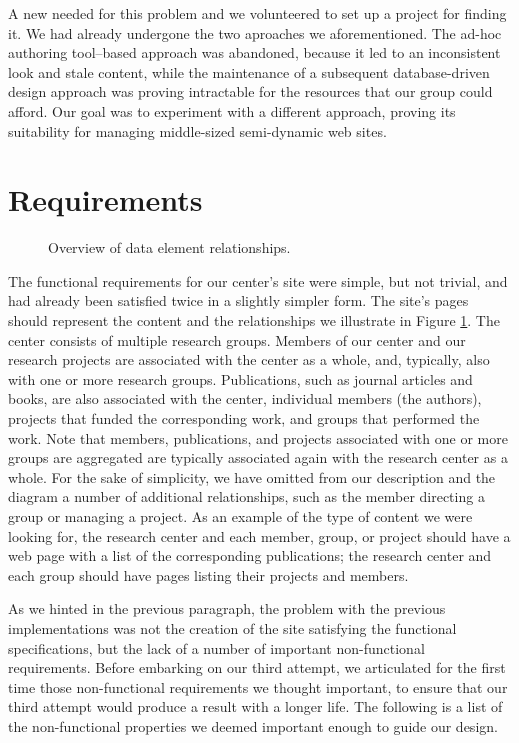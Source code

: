 \documentclass[10pt]{article}
\begin{document}
A new needed for this problem and we volunteered to 
set up a project for finding it. We had already undergone the 
two aproaches we aforementioned.
The ad-hoc authoring tool--based approach was abandoned,
because it led to an inconsistent look and stale content,
while the maintenance of a subsequent database-driven
design approach was proving intractable for the resources that
our group could afford.
Our goal was to experiment with a
different approach,
proving its suitability for managing middle-sized semi-dynamic
web sites.

\section{Requirements}
\label{sec:req}
\begin{figure}
\begin{center}
\leavevmode
{}
\end{center}
\caption{
\label{fig:diag}
Overview of data element relationships.}
\end{figure}

The functional requirements for our center's site were
simple, but not trivial, and had already been satisfied
twice in a slightly simpler form.
The site's pages should represent the content and the relationships
we illustrate in Figure \ref{fig:diag}.
The center consists of multiple research groups.
Members of our center and our research projects are
associated with the center as a whole, and, typically, also
with one or more research groups.
Publications, such as journal articles and books,
are also associated with the center, individual members (the authors),
projects that funded the corresponding work,
and groups that performed the work.
Note that members, publications, and projects associated
with one or more groups are aggregated are typically associated
again with the research center as a whole.
For the sake of simplicity,
we have omitted from our description and the diagram
a number of additional relationships,
such as the member directing a group or managing a project.
As an example of the type of content we were looking for,
the research center and
each member, group, or project should have a web page with a list
of the corresponding publications;
the research center and each group should have pages listing
their projects and members.

As we hinted in the previous paragraph, the problem with
the previous implementations was not the creation of the site
satisfying the functional specifications,
but the lack of a number of important non-functional requirements.
Before embarking on our third attempt,
we articulated for the first time those non-functional requirements
we thought important, to ensure that our third attempt would produce
a result with a longer life.
The following is a list of the non-functional properties
we deemed important enough to guide our design.
\end{document}
